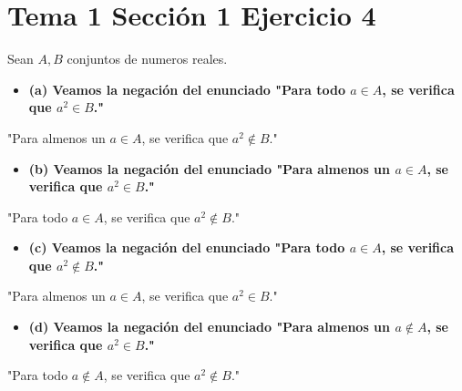 \documentclass{article}
\begin{document}
\section{Tema 1 Sección 1 Ejercicio 4}
Sean $A,B$ conjuntos de numeros reales.
\begin{itemize}
\item \bf (a) \rm Veamos la negación del enunciado "Para todo $a\in  A$, se verifica que $a^2\in B$."
\end{itemize}
"Para almenos un $a\in A$, se verifica que $a^2\notin B$."
\begin{itemize}
\item \bf (b) \rm Veamos la negación del enunciado "Para almenos un $a\in  A$, se verifica que $a^2\in B$."
\end{itemize}
"Para todo $a\in A$, se verifica que $a^2\notin B$."
\begin{itemize}
\item \bf (c) \rm Veamos la negación del enunciado "Para todo $a\in  A$, se verifica que $a^2\notin B$."
\end{itemize}
"Para almenos un $a\in A$, se verifica que $a^2\in B$."
\begin{itemize}
\item \bf (d) \rm Veamos la negación del enunciado "Para almenos un $a\notin  A$, se verifica que $a^2\in B$."
\end{itemize}
"Para todo $a\notin A$, se verifica que $a^2\notin B$."
\end{document}
